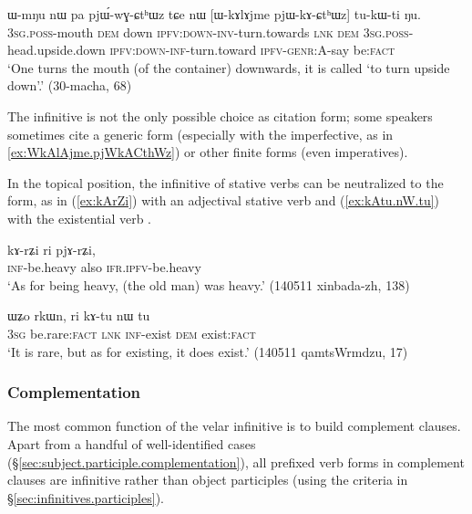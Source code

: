 \begin{exe}
\ex \label{ex:WkAlAjme.pjWkACthWz}
 \gll  ɯ-mŋu nɯ pa pjɯ́-wɣ-ɕtʰɯz tɕe nɯ [ɯ-kɤlɤjme pjɯ-kɤ-ɕtʰɯz] tu-kɯ-ti ŋu. \\
\textsc{3sg}.\textsc{poss}-mouth \textsc{dem} down \textsc{ipfv}:\textsc{down}-\textsc{inv}-turn.towards \textsc{lnk} \textsc{dem}  \textsc{3sg.poss}-head.upside.down   \textsc{ipfv}:\textsc{down}-\textsc{inf}-turn.toward \textsc{ipfv-genr}:A-say be:\textsc{fact}  \\
\glt `One turns the mouth (of the container) downwards, it is called `to turn upside down'.' (30-macha, 68)
\end{exe}

The infinitive is not the only possible choice as citation form; some speakers sometimes cite a generic form (especially with the imperfective, as  in \ref{ex:WkAlAjme.pjWkACthWz}) or other finite forms (even imperatives).

In the topical position, the infinitive of stative verbs can be neutralized to the  form, as in (\ref{ex:kArZi}) with an adjectival stative verb and (\ref{ex:kAtu.nW.tu}) with the existential verb .

\begin{exe}
\ex \label{ex:kArZi}
 \gll kɤ-rʑi ri pjɤ-rʑi, 	  \\
 \textsc{inf}-be.heavy also \textsc{ifr.ipfv}-be.heavy \\
 \glt `As for being heavy, (the old man) was heavy.'  (140511 xinbada-zh, 138)
\end{exe}

\begin{exe}
\ex \label{ex:kAtu.nW.tu}
 \gll ɯʑo rkɯn, ri kɤ-tu nɯ tu  \\
 \textsc{3sg} be.rare:\textsc{fact} \textsc{lnk} \textsc{inf}-exist \textsc{dem} exist:\textsc{fact} \\
 \glt `It is rare, but as for existing, it does exist.' (140511 qamtsWrmdzu, 17)
\end{exe}

\subsubsection{Complementation}    \label{sec:inf.complementation}
The most common function of the velar infinitive is to build complement clauses. Apart from a handful of well-identified cases (§\ref{sec:subject.participle.complementation}), all  prefixed verb forms in complement clauses are infinitive rather than object participles (using the criteria in §\ref{sec:infinitives.participles}). 

